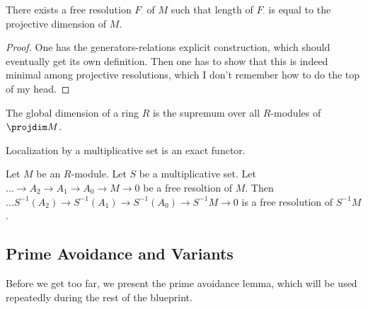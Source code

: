 \begin{proposition}
  \label{prop:existence_min_free_resl}
  There exists a free resolution $F_\cdot$
  of $M$ such that length of $F_\cdot$
  is equal to the projective dimension of $M$.
\end{proposition}

\begin{proof}
  One has the generators-relations explicit construction,
  which should eventually get its own definition.
  Then one has to show that this is indeed minimal among
  projective resolutions, which I don't remember how to do
  the top of my head.
\end{proof}


\begin{definition}
  \label{def:globdim}
  The global dimension of a ring $R$
  is the supremum over all $R$-modules
  of $\projdim M$.
\end{definition}


\begin{lemma}
  \label{lem:loczn_exact}
  Localization by a multiplicative set is an exact functor.
\end{lemma}

\begin{lemma}
  \label{lem:loczn_of_resl_is_resl}
  Let $M$ be an $R$-module.
  Let $S$ be a multiplicative set.
  Let $\ldots \to A_2 \to A_1 \to A_0 \to M \to 0$
  be a free resoltion of $M$.
  Then
  $\ldots S^{-1}(A_2) \to S^{-1}(A_1) \to S^{-1}(A_0) \to S^{-1}M \to 0$
  is a free resolution of $S^{-1}M$.
\end{lemma}



\subsection{Prime Avoidance and Variants}

Before we get too far, we present the prime avoidance lemma, which will be used
repeatedly during the rest of the blueprint.

